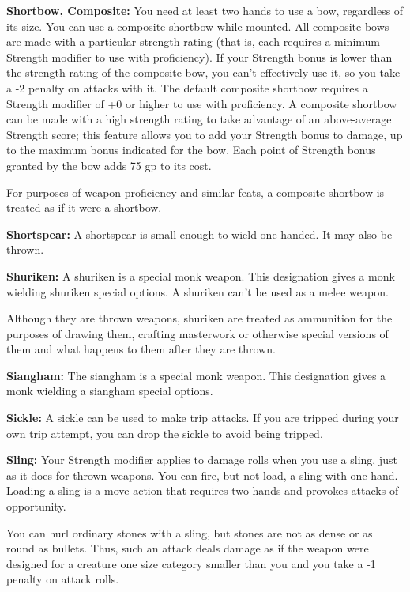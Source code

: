 \documentclass{article}
\begin{document}
\textbf{Shortbow, Composite: }You need at least two hands to use a bow, regardless 
of its size. You can use a composite shortbow while mounted. All composite bows 
are made with a particular strength rating (that is, each requires a minimum Strength 
modifier to use with proficiency). If your Strength bonus is lower than the strength 
rating of the composite bow, you can't effectively use it, so you take a -2 penalty 
on attacks with it. The default composite shortbow requires a Strength modifier 
of +0 or higher to use with proficiency. A composite shortbow can be made with 
a high strength rating to take advantage of an above-average Strength score; this 
feature allows you to add your Strength bonus to damage, up to the maximum bonus 
indicated for the bow. Each point of Strength bonus granted by the bow adds 75 
gp to its cost. 

For purposes of weapon proficiency and similar feats, a composite shortbow is treated 
as if it were a shortbow.

\textbf{Shortspear:} A shortspear is small enough to wield one-handed. It may also 
be thrown.

\textbf{Shuriken:} A shuriken is a special monk weapon. This designation gives 
a monk wielding shuriken special options. A shuriken can't be used as a melee weapon.

Although they are thrown weapons, shuriken are treated as ammunition for the purposes 
of drawing them, crafting masterwork or otherwise special versions of them and 
what happens to them after they are thrown.

\textbf{Siangham: }The siangham is a special monk weapon. This designation gives 
a monk wielding a siangham special options.

\textbf{Sickle: }A sickle can be used to make trip attacks. If you are tripped 
during your own trip attempt, you can drop the sickle to avoid being tripped.

\textbf{Sling: }Your Strength modifier applies to damage rolls when you use a sling, 
just as it does for thrown weapons. You can fire, but not load, a sling with one 
hand. Loading a sling is a move action that requires two hands and provokes attacks 
of opportunity.

You can hurl ordinary stones with a sling, but stones are not as dense or as round 
as bullets. Thus, such an attack deals damage as if the weapon were designed for 
a creature one size category smaller than you and you take a -1 penalty on attack 
rolls.
\end{document}

